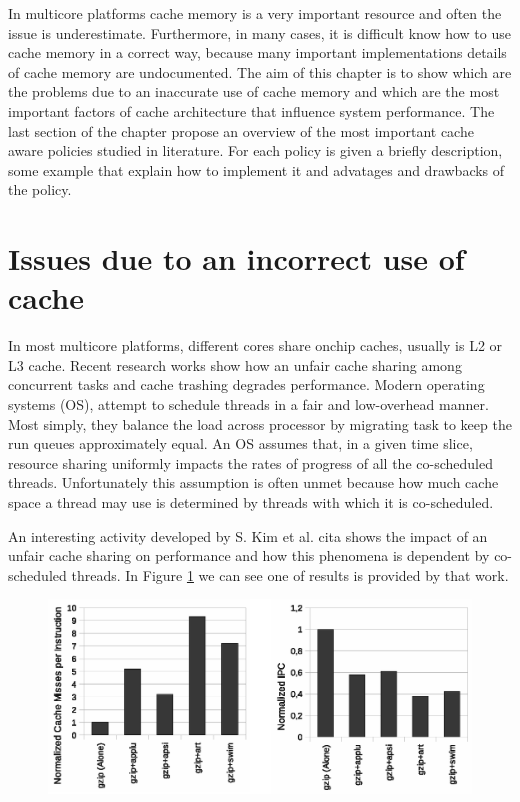 In multicore platforms cache memory is a very important resource and often the issue is underestimate. Furthermore, in many cases, it is difficult know 
how to use cache memory in a correct way, because many important implementations details of cache memory are undocumented. The aim of this chapter is 
to show which are the problems due to an inaccurate use of cache memory and which are the most important factors of cache architecture that influence 
system performance. The last section of the chapter propose an overview of the most important cache aware policies studied in literature. For each policy 
is given a briefly description, some example that explain how to implement it and advatages and drawbacks of the policy.

\section{Issues due to an incorrect use of cache}
\label{sec:s1}

In most multicore platforms, different cores share onchip caches, usually is L2 or L3 cache. Recent research works show how an unfair cache sharing
among concurrent tasks and cache trashing degrades performance. Modern operating systems (OS), attempt to schedule threads in a
fair and low-overhead manner.
Most simply, they balance the load across processor by migrating task to keep the run queues approximately equal. An OS assumes that,
in a given time slice, resource sharing uniformly impacts the rates of progress of all the co-scheduled threads.
Unfortunately this assumption is often unmet because how much cache space a thread may use is determined by threads with which it is co-scheduled.

An interesting activity developed by S. Kim et al. \cite{Chandra} cita shows the impact of an unfair cache sharing on performance and how this phenomena is 
dependent by co-scheduled threads. In Figure \ref{fig:gzip_miss} we can see one of results is provided by that work.

\begin{figure}[htbp]
\centering
\includegraphics[width=\widefigure]{images/chandra_gzip}
\caption{}
\label{fig:gzip_miss}
\end{figure}

